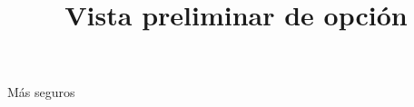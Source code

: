 \documentclass[a4paper,10pt]{article}\usepackage[utf8]{inputenc}\usepackage[spanish]{babel}\usepackage{times}
\title{Vista preliminar de opción}
\begin{document}
\twocolumn 

\maketitle

Más seguros
\end{document}
